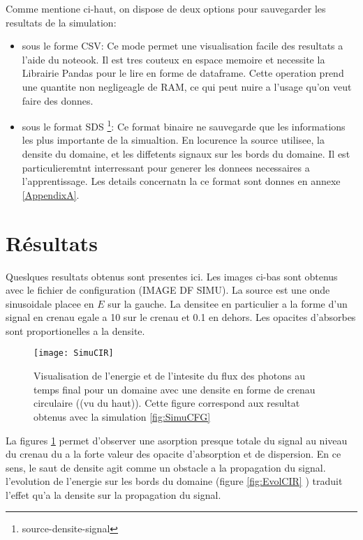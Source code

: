 Comme mentione ci-haut, on dispose de deux options pour sauvegarder les resultats de la simulation:

\begin{itemize}
 \item sous le forme CSV: Ce mode permet une visualisation facile des resultats a l'aide du noteook. Il est tres couteux en espace memoire et necessite la Librairie Pandas pour le lire en forme de dataframe. Cette operation prend une quantite non negligeagle de RAM, ce qui peut nuire a l'usage qu'on veut faire des donnes.
 
 \item sous le format SDS \footnote{source-densite-signal}: Ce format binaire ne sauvegarde que les informations les plus importante de la simualtion. En locurence la source utilisee, la densite du domaine, et les diffetents signaux sur les bords du domaine. Il est particulieremtnt interressant pour generer les donnees necessaires a l'apprentissage. Les details concernatn la ce format sont donnes en annexe \ref{AppendixA}.
\end{itemize}


\section{Résultats}

Queslques resultats obtenus sont presentes ici. Les images ci-bas sont obtenus avec le fichier de configuration (IMAGE DF SIMU). La source est une onde sinusoidale placee en $E$ sur la gauche. La densitee en particulier a la forme d'un signal en crenau egale a 10 sur le crenau et 0.1 en dehors. Les opacites d'absorbes sont proportionelles a la densite.

\begin{figure}[!h]
\centering
\texttt{[image: SimuCIR]} 
\decoRule
\caption[SimuCIR]{Visualisation de l'energie et de l'intesite du flux des photons au temps final pour un domaine avec une densite en forme de crenau circulaire ((vu du haut)). Cette figure correspond aux resultat obtenus avec la simulation \ref{fig:SimuCFG}}
\label{fig:SimuCIR}
\end{figure}

La figures \ref{fig:SimuCIR} permet d'observer une asorption presque totale du signal au niveau du crenau du a la forte valeur des opacite d'absorption et de dispersion. En ce sens, le saut de densite agit comme un obstacle a la propagation du signal. l'evolution de l'energie sur les bords  du domaine (figure \ref{fig:EvolCIR} ) traduit l'effet qu'a la densite sur la propagation du signal.

